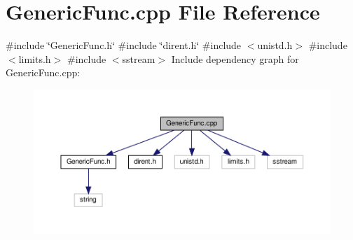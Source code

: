 \section{Generic\+Func.\+cpp File Reference}
\label{_generic_func_8cpp}
{\ttfamily \#include \char`\"{}Generic\+Func.\+h\char`\"{}}\newline
{\ttfamily \#include \char`\"{}dirent.\+h\char`\"{}}\newline
{\ttfamily \#include $<$unistd.\+h$>$}\newline
{\ttfamily \#include $<$limits.\+h$>$}\newline
{\ttfamily \#include $<$sstream$>$}\newline
Include dependency graph for Generic\+Func.\+cpp\+:\nopagebreak
\begin{figure}[H]
\begin{center}
\leavevmode
\includegraphics[width=350pt]{_generic_func_8cpp__incl}
\end{center}
\end{figure}
